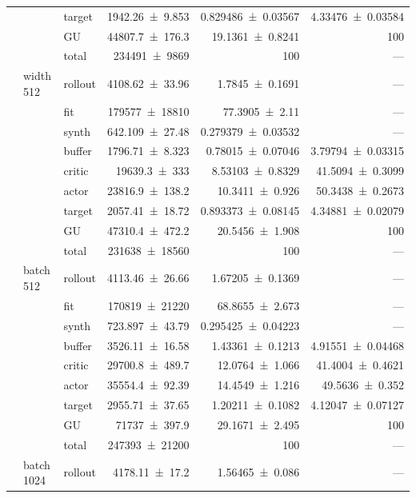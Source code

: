 {\begin{longtable}{@{}lllrrr@{}}
     &  & target & \num{1942.26+-9.853} & \num{0.829486+-0.03567} & \num{4.33476+-0.03584} \\
     &  & GU & \num{44807.7+-176.3} & \num{19.1361+-0.8241} & 100 \\
     &  & total & \num{234491+-9869} & \num{100} & --- \\
    \addlinespace[2pt]
     & width 512 & rollout & \num{4108.62+-33.96} & \num{1.7845+-0.1691} & --- \\
     &  & fit & \num{179577+-18810} & \num{77.3905+-2.11} & --- \\
     &  & synth & \num{642.109+-27.48} & \num{0.279379+-0.03532} & --- \\
     &  & buffer & \num{1796.71+-8.323} & \num{0.78015+-0.07046} & \num{3.79794+-0.03315} \\
     &  & critic & \num{19639.3+-333} & \num{8.53103+-0.8329} & \num{41.5094+-0.3099} \\
     &  & actor & \num{23816.9+-138.2} & \num{10.3411+-0.926} & \num{50.3438+-0.2673} \\
     &  & target & \num{2057.41+-18.72} & \num{0.893373+-0.08145} & \num{4.34881+-0.02079} \\
     &  & GU & \num{47310.4+-472.2} & \num{20.5456+-1.908} & 100 \\
     &  & total & \num{231638+-18560} & \num{100} & --- \\
    \addlinespace[2pt]
     & batch 512 & rollout & \num{4113.46+-26.66} & \num{1.67205+-0.1369} & --- \\
     &  & fit & \num{170819+-21220} & \num{68.8655+-2.673} & --- \\
     &  & synth & \num{723.897+-43.79} & \num{0.295425+-0.04223} & --- \\
     &  & buffer & \num{3526.11+-16.58} & \num{1.43361+-0.1213} & \num{4.91551+-0.04468} \\
     &  & critic & \num{29700.8+-489.7} & \num{12.0764+-1.066} & \num{41.4004+-0.4621} \\
     &  & actor & \num{35554.4+-92.39} & \num{14.4549+-1.216} & \num{49.5636+-0.352} \\
     &  & target & \num{2955.71+-37.65} & \num{1.20211+-0.1082} & \num{4.12047+-0.07127} \\
     &  & GU & \num{71737+-397.9} & \num{29.1671+-2.495} & 100 \\
     &  & total & \num{247393+-21200} & \num{100} & --- \\
    \addlinespace[2pt]
     & batch 1024 & rollout & \num{4178.11+-17.2} & \num{1.56465+-0.086} & --- \\

\end{longtable}}
